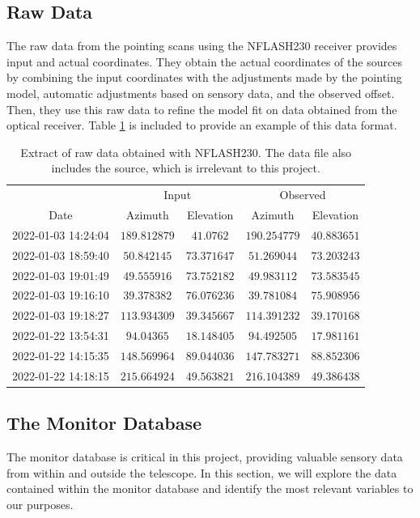 \subsection{Raw Data}
The raw data from the pointing scans using the NFLASH230 receiver provides input and actual coordinates.
They obtain the actual coordinates of the sources by combining the input coordinates with the adjustments made by the pointing model,
automatic adjustments based on sensory data, and the observed offset.
Then, they use this raw data to refine the model fit on data obtained from the optical receiver.
Table \ref{tab:raw_datanflash230} is included to provide an example of this data format. 


\begin{table}[h]
    \centering
    \caption{Extract of raw data obtained with NFLASH230. The data file also includes the source, which is irrelevant to this project.}
    \begin{tabular}{ccccc}
         & \multicolumn{2}{c}{Input} & \multicolumn{2}{c}{Observed} \\ 
        \cline{2-3} \cline{4-5}
        Date & Azimuth & Elevation & Azimuth & Elevation \\ 
        \hline
        2022-01-03 14:24:04 & $189.812879$ & $41.0762$ & $190.254779$ & $40.883651$ \\
        2022-01-03 18:59:40 & $50.842145$ & $73.371647$ & $51.269044$ & $73.203243$ \\
        2022-01-03 19:01:49 & $49.555916$ & $73.752182$ & $49.983112$ & $73.583545$ \\
        2022-01-03 19:16:10 & $39.378382$ & $76.076236$ & $39.781084$ & $75.908956$ \\
        2022-01-03 19:18:27 & $113.934309$ & $39.345667$ & $114.391232$ & $39.170168$ \\
        2022-01-22 13:54:31 & $94.04365$ & $18.148405$ & $94.492505$ & $17.981161$ \\
        2022-01-22 14:15:35 & $148.569964$ & $89.044036$ & $147.783271$ & $88.852306$ \\
        2022-01-22 14:18:15 & $215.664924$ & $49.563821$ & $216.104389$ & $49.386438$ \\
    \end{tabular}
    \label{tab:raw_datanflash230}
    \end{table}



\subsection{The Monitor Database}
The monitor database is critical in this project, providing valuable sensory data from within and outside the telescope.
In this section, we will explore the data contained within the monitor database and identify the most relevant variables to our purposes.


